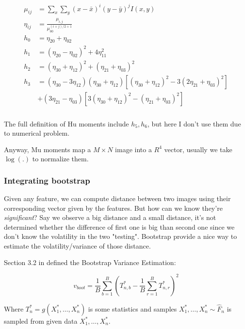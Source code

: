 \documentclass{beamer}
\begin{document}
\begin{frame}

  \begin{align}
    \begin{split}
      \mu_{ij} &= \sum_x \sum_y (x-\bar{x})^i(y-\bar{y})^j I(x,y)\\
      \eta_{ij} &= \frac{\mu_{i,j}}{\mu_{00}^{(i+j)/2+1}} \\
      h_0 &= \eta_{20}+\eta_{02} \\
      h_1 &= (\eta_{20} - \eta_{02})^2 + 4\eta_{11}^2 \\
      h_2 &= (\eta_{30} + \eta_{12})^2 + (\eta_{21}+\eta_{03})^2 \\
      h_3 &= (\eta_{30}-3\eta_{12})(\eta_{30}+\eta_{12})[(\eta_{30}+\eta_{12})^2-3(2\eta_{21}+\eta_{03})^2] \\
          &+ (3\eta_{21}-\eta_{03})[3(\eta_{30}+\eta_{12})^2-(\eta_{21}+\eta_{03})^2] \\
    \end{split} 
    \label{eq:mu_moment}
  \end{align}
  
  The full definition of Hu moments include $h_5,h_6$, but here I don't use them due to
  numerical problem. 
  
  Anyway, Mu moments map a $M \times N$ image into a $R^4$ vector, usually we take $\log(.)$ to normalize them.
    
\end{frame}

\begin{frame}
  \frametitle{Integrating bootstrap}

  Given any feature, we can compute distance between two images using their corresponding vector given by the features. But how can we know
they're \textit{significant}? Say we observe a big distance and a small distance, it's not determined whether the difference of first one is 
big than second one since we don't know the volatility in the two "testing". Bootstrap provide a nice way to estimate the volatility/variance
of those distance.

Section 3.2 in \cite{wasserman2006all} defined the Bootstrap Variance Estimation:

$$
v_{boot} = \frac{1}{B} \sum_{b=1}^B \left( T^*_{n,b} - \frac{1}{B}\sum_{r=1}^B T^*_{n,r} \right)^2
$$

Where $T_n^*=g(X_1^*,\dots,X_n^*)$ is some statistics and samples $X_1^*,\dots,X_n^* \sim \hat{F}_n$ is sampled from given data $X_1^*,\dots,X_n^*$.

\end{frame}
\end{document}
